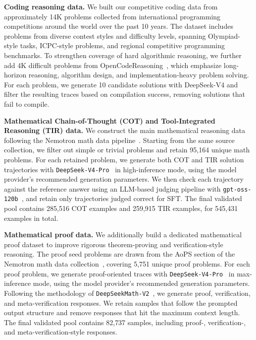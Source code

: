 \textbf{Coding reasoning data.}
We built our competitive coding data from approximately 14K problems collected from international programming competitions around the world over the past 10 years. The dataset includes problems from diverse contest styles and difficulty levels, spanning Olympiad-style tasks, ICPC-style problems, and regional competitive programming benchmarks. To strengthen coverage of hard algorithmic reasoning, we further add 4K difficult problems from OpenCodeReasoning~\citep{ahmad2025opencodereasoning}, which emphasize long-horizon reasoning, algorithm design, and implementation-heavy problem solving. For each problem, we generate 10 candidate solutions with DeepSeek-V4 and filter the resulting traces based on compilation success, removing solutions that fail to compile.



\textbf{Mathematical Chain-of-Thought (COT) and Tool-Integrated Reasoning (TIR) data.}
We construct the main mathematical reasoning data following the Nemotron math data pipeline~\citep{du2025nemotron}. Starting from the same source collection, we filter out simple or trivial problems and retain 95{,}164 unique math problems. For each retained problem, we generate both COT and TIR solution trajectories with \texttt{DeepSeek-V4-Pro}~\citep{deepseekai2026deepseekv4} in high-inference mode, using the model provider's recommended generation parameters. We then check each trajectory against the reference answer using an LLM-based judging pipeline with \texttt{gpt-oss-120b}~\citep{openai2025gptoss120bgptoss20bmodel}, and retain only trajectories judged correct for SFT. The final validated pool contains 285{,}516 COT examples and 259{,}915 TIR examples, for 545{,}431 examples in total.

\textbf{Mathematical proof data.}
We additionally build a dedicated mathematical proof dataset to improve rigorous theorem-proving and verification-style reasoning. The proof seed problems are drawn from the AoPS \cite{AoPS} section of the Nemotron math data collection~\citep{du2025nemotron}, covering 5{,}751 unique proof problems. For each proof problem, we generate proof-oriented traces with \texttt{DeepSeek-V4-Pro}~\citep{deepseekai2026deepseekv4} in max-inference mode, using the model provider's recommended generation parameters. Following the methodology of \texttt{DeepSeekMath-V2}~\citep{shao2025deepseekmath}, we generate proof, verification, and meta-verification responses. We retain samples that follow the prompted output structure and remove responses that hit the maximum context length. The final validated pool contains 82{,}737 samples, including proof-, verification-, and meta-verification-style responses.

